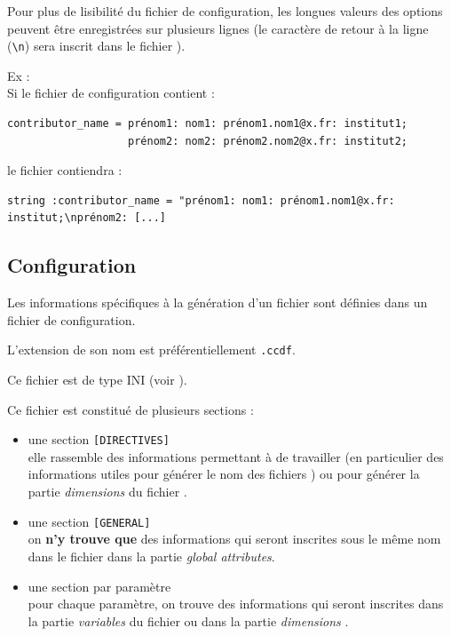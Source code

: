 Pour plus de lisibilité du fichier de configuration, les longues valeurs
des options peuvent être enregistrées sur plusieurs lignes (le caractère
de retour à la ligne (\texttt{\textbackslash{}n}) sera inscrit dans le
fichier \netcdf).

Ex :\\
Si le fichier de configuration contient :

\begin{verbatim}
contributor_name = prénom1: nom1: prénom1.nom1@x.fr: institut1;
                   prénom2: nom2: prénom2.nom2@x.fr: institut2;
\end{verbatim}

le fichier \netcdf contiendra :

\begin{verbatim}
string :contributor_name = "prénom1: nom1: prénom1.nom1@x.fr: institut;\nprénom2: [...]
\end{verbatim}

\subsection{Configuration}\label{ref:configuration}

Les informations spécifiques à la génération d'un fichier
\netcdf sont définies dans un fichier de configuration.
\medbreak

L'extension de son nom est préférentiellement \texttt{.ccdf}.
\medbreak

Ce fichier est de type INI (voir ). \\
\medbreak

Ce fichier est constitué de plusieurs sections :
\medbreak

\begin{itemize}
\item
  une section \texttt{[DIRECTIVES]}\\
  elle rassemble des informations permettant à \prodcdf de
  travailler (en particulier des informations utiles pour générer le nom
  des fichiers \netcdf) ou pour générer la partie
  \textit{dimensions} du fichier \netcdf.
\item
  une section \texttt{[GENERAL]}\\
  on \textbf{n'y trouve que} des informations qui seront inscrites sous
  le même nom dans le fichier \netcdf dans la partie
  \textit{global attributes}.
\item
  une section par paramètre\\
  pour chaque paramètre, on trouve des informations qui seront inscrites
  dans la partie \textit{variables} du fichier \netcdf ou
  dans la partie \textit{dimensions} .
\end{itemize}
\medbreak

